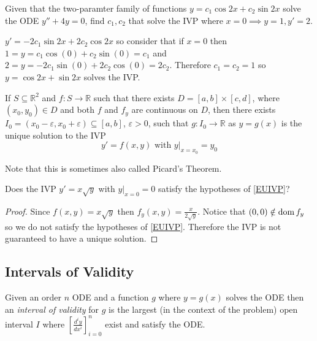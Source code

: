 \documentclass[notes.tex]{subfiles}
\begin{document}
\begin{exercise}
    Given that the two-paramter family of functions $y = c_1\cos 2x + c_2\sin 2x$ solve the ODE $y'' + 4y = 0$, find $c_1, c_2$ that solve the IVP where $x = 0 \implies y = 1, y' = 2$.
\end{exercise}
\begin{solution}
    $y' = -2c_1 \sin 2x + 2c_2 \cos 2x$ so consider that if $x = 0$ then
    $1 = y = c_1 \cos (0) + c_2 \sin (0) = c_1$ and $2 = y = -2c_1 \sin (0) + 2c_2 \cos (0) = 2c_2$. Therefore $c_1 = c_2 = 1$ so $y = \cos 2x + \sin 2x$ solves the IVP.
\end{solution}

\begin{theorem} \label{EUIVP}
    If $S \subseteq \mathbb{R}^2$ and $f\colon S \to \mathbb{R}$ such that there exists $D = [a, b] \times [c, d]$, where $(x_0, y_0) \in D$ and both $f$ and $f_y$ are continuous on $D$, then there exists $I_0 = (x_0 - \varepsilon, x_0 + \varepsilon) \subseteq [a, b]$, $\varepsilon >0$, such that $g\colon I_0 \to \mathbb{R}$ as $y = g(x)$ is the unique solution to the IVP
    \[
        y' = f(x, y) \text{ with } y|_{x = x_0} = y_0
    \]
\end{theorem}

Note that this is sometimes also called Picard's Theorem.

\begin{exercise}
    Does the IVP $y' = x\sqrt{y}$ with $y|_{x = 0} = 0$ satisfy the hypotheses of \cref{EUIVP}?
\end{exercise}
\begin{proof}
    Since $f(x, y) = x\sqrt{y}$ then $f_y(x, y) = \frac{x}{2\sqrt{y}}$. Notice that $(0, 0) \notin \operatorname{dom} f_y$ so we do not satisfy the hypotheses of \cref{EUIVP}. Therefore the IVP is not guaranteed to have a unique solution.
\end{proof}

\subsection{Intervals of Validity}
\begin{definition}
    Given an order $n$ ODE and a function $g$ where $y = g(x)$ solves the ODE then an \textit{interval of validity} for $g$ is the largest (in the context of the problem) open interval $I$ where $\left[ \frac{d^i y}{dx^i} \right]_{i = 0}^n$ exist and satisfy the ODE. 
\end{definition}
\end{document}
